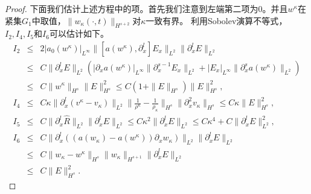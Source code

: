 \begin{proof}
下面我们估计上述方程中的项。首先我们注意到左端第二项为$0$。并且$w^\kappa$在紧集$G_1$中取值，$\|w_\kappa(\cdot, t)\|_{H^{s+2}}$对$\kappa$一致有界。 利用Sobolev演算不等式\cite{majda1984compressible}，$I_2, I_4, I_5$和$I_6$可以估计如下。
\begin{eqnarray*}
  I_2 &\le& 2 |a_0(w^\kappa)|_{L^\infty} \|[a(w^\kappa),\partial^l_x]E_x\|_{L^2} \|\partial^l_x E\|_{L^2} \nonumber \\
  &\le& C \|\partial^l_x E\|_{L^2} (|\partial_x a(w^\kappa)|_{L^\infty}\|\partial^{s-1}_x E_x\|_{L^2} + |E_x|_{L^\infty} \|\partial^s_x a(w^\kappa)\|_{L^2})  \nonumber \\
  &\le& C \|w^\kappa\|_{H^s} \|E\|_{H^s}^2 \le C (1+\|E\|_{H^s}) \|E\|_{H^s}^2, \nonumber \\
  I_4 &\le&  C \kappa \|\partial^l_x (v^\kappa-v_\kappa)\|_{L^2} \|\frac{1}{\rho^\kappa}-\frac{1}{\rho_\kappa}\|_{H^s} \|\partial^2_x v_\kappa\|_{H^s}
  \le C \kappa \|E\|_{H^s}^2, \nonumber\\
  I_5 &\le& C \|\partial^l_x \hat{R}\|_{L^2} \|\partial^l_x E\|_{L^2} \le C\kappa^2\|\partial^l_x E\|_{L^2} \le C \kappa^4 + C \|\partial^l_x E\|_{L^2}^2, \nonumber \\
  I_6 &\le& C\|\partial^l_x ((a(w_\kappa)-a(w^\kappa))\partial_x w_\kappa)\|_{L^2} \|\partial^l_x E\|_{L^2}\nonumber\\
      &\le&  C \|w_\kappa-w^\kappa\|_{H^s} \|w_\kappa\|_{H^{s+1}} \|\partial^l_x E\|_{L^2} \nonumber\\
      &\le&  C \|E\|_{H^s}^2. \label{515}
\end{eqnarray*}


\end{proof}
